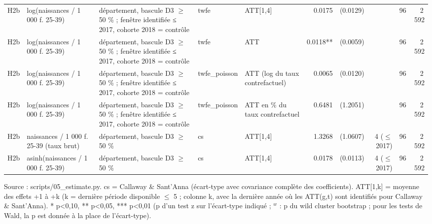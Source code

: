 \begin{table}
\begin{threeparttable}
\begin{tabular}{lp{3.8cm}p{6.5cm}lp{3.5cm}rrrrr}
H2b & log(naissances / 1 000 f. 25-39) & département, bascule D3 $\geq$ 50 \% ; fenêtre identifiée ≤ 2017, cohorte 2018 = contrôle & twfe & ATT[1,4] & 0.0175 & (0.0129) &  & 96 & 2\,592 \\
H2b & log(naissances / 1 000 f. 25-39) & département, bascule D3 $\geq$ 50 \% ; fenêtre identifiée ≤ 2017, cohorte 2018 = contrôle & twfe & ATT & 0.0118** & (0.0059) &  & 96 & 2\,592 \\
H2b & log(naissances / 1 000 f. 25-39) & département, bascule D3 $\geq$ 50 \% ; fenêtre identifiée ≤ 2017, cohorte 2018 = contrôle & twfe\_poisson & ATT (log du taux contrefactuel) & 0.0065 & (0.0120) &  & 96 & 2\,592 \\
H2b & log(naissances / 1 000 f. 25-39) & département, bascule D3 $\geq$ 50 \% ; fenêtre identifiée ≤ 2017, cohorte 2018 = contrôle & twfe\_poisson & ATT en \% du taux contrefactuel & 0.6481 & (1.2051) &  & 96 & 2\,592 \\
H2b & naissances / 1 000 f. 25-39 (taux brut) & département, bascule D3 $\geq$ 50 \% & cs & ATT[1,4] & 1.3268 & (1.0607) & 4 ($\leq$ 2017) & 96 & 2\,592 \\
H2b & asinh(naissances / 1 000 f. 25-39) & département, bascule D3 $\geq$ 50 \% & cs & ATT[1,4] & 0.0178 & (0.0113) & 4 ($\leq$ 2017) & 96 & 2\,592 \\
\bottomrule
\end{tabular}
\begin{tablenotes}\footnotesize
\item Source : scripts/05\_estimate.py. cs = Callaway \& Sant'Anna (écart-type avec covariance complète des coefficients). ATT[1,k] = moyenne des effets +1 à +k (k = dernière période disponible $\leq$ 5 ; colonne k, avec la dernière année où les ATT(g,t) sont identifiés pour Callaway \& Sant'Anna). * p<0,10, ** p<0,05, *** p<0,01 (p d'un test z sur l'écart-type indiqué ; $^{w}$ : p du wild cluster bootstrap ; pour les tests de Wald, la p est donnée à la place de l'écart-type).
\end{tablenotes}
\end{threeparttable}
\end{table}
